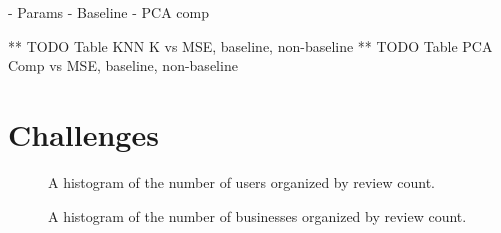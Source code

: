 \documentclass[10pt,twocolumn,letterpaper]{article}
\begin{document}
- Params
- Baseline
- PCA comp

** TODO Table KNN K vs MSE, baseline, non-baseline
** TODO Table PCA Comp vs MSE, baseline, non-baseline


\section{Challenges}

\begin{figure}[t]
\begin{center}
\end{center}
   \caption{A histogram of the number of users organized by review count.}
\label{fig:usrCnt}
\end{figure}

\begin{figure}[t]
\begin{center}
\end{center}
   \caption{A histogram of the number of businesses organized by review count.}
\label{fig:bizCnt}
\end{figure}
\end{document}

